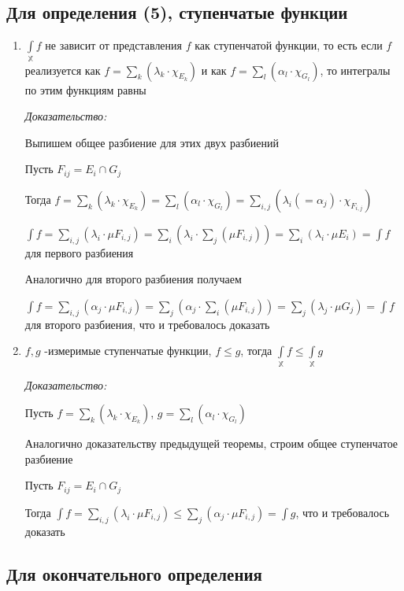 \documentclass[paper=a4, fontsize=17pt]{article}
\begin{document}
\subsection{Для определения (5), ступенчатые функции}
\begin{enumerate}
	\item $\int\limits_{\mathds{X}}f$ не зависит от представления $f$ как ступенчатой функции, то есть если $f$ реализуется как $f = \sum\limits_{k}(\lambda_k \cdot \chi_{E_k})$ и как $f = \sum\limits_{l}(\alpha_l \cdot \chi_{G_l})$, то интегралы по этим функциям равны

	\emph{Доказательство:}

	Выпишем общее разбиение для этих двух разбиений

	Пусть $F_{ij} = E_i \cap G_j$

	Тогда $f = \sum\limits_{k}(\lambda_k \cdot \chi_{E_k}) = \sum\limits_{l}(\alpha_l \cdot \chi_{G_l}) = \sum\limits_{i, j}(\lambda_i (= \alpha_j) \cdot \chi_{F_{i, j}})$

	$\int f = \sum\limits_{i, j}(\lambda_i \cdot \mu F_{i, j}) = \sum\limits_i (\lambda_i \cdot \sum\limits_j (\mu F_{i, j})) = \sum\limits_i (\lambda_i \cdot \mu E_i) = \int f$ для первого разбиения

	Аналогично для второго разбиения получаем

	$\int f = \sum\limits_{i, j}(\alpha_j \cdot \mu F_{i, j}) = \sum\limits_j (\alpha_j \cdot \sum\limits_i (\mu F_{i, j})) = \sum\limits_j (\lambda_j \cdot \mu G_j) = \int f$ для второго разбиения, что и требовалось доказать

	\item $f, g$ -измеримые ступенчатые функции, $f \leqslant g$, тогда $\int\limits_{\mathds{X}} f \leqslant \int\limits_{\mathds{X}} g$

	\emph{Доказательство:}

	Пусть $f = \sum\limits_{k}(\lambda_k \cdot \chi_{E_k})$, $g = \sum\limits_{l}(\alpha_l \cdot \chi_{G_l})$

	Аналогично доказательству предыдущей теоремы, строим общее ступенчатое разбиение

	Пусть $F_{ij} = E_i \cap G_j$

	Тогда $\int f = \sum\limits_{i, j}(\lambda_i \cdot \mu F_{i, j}) \leqslant \sum\limits_j(\alpha_j \cdot \mu F_{i, j}) = \int g$, что и требовалось доказать
\end{enumerate}

\subsection{Для окончательного определения}
\end{document}
